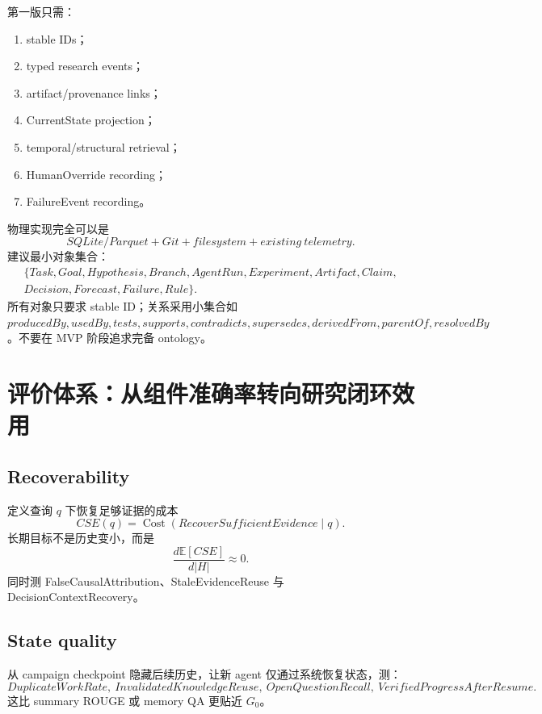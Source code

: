 \documentclass[11pt,a4paper]{ctexart}
\newcommand{\E}{\mathbb{E}}
\newcommand{\Cost}{\operatorname{Cost}}
\begin{document}
第一版只需：
\begin{enumerate}
\item stable IDs；
\item typed research events；
\item artifact/provenance links；
\item CurrentState projection；
\item temporal/structural retrieval；
\item HumanOverride recording；
\item FailureEvent recording。
\end{enumerate}
物理实现完全可以是
\begin{equation}
\boxed{SQLite/Parquet+Git+filesystem+existing\ telemetry.}
\end{equation}
建议最小对象集合：
\begin{equation}
\begin{gathered}
\{Task,Goal,Hypothesis,Branch,AgentRun,Experiment,Artifact,Claim,\\
Decision,Forecast,Failure,Rule\}.
\end{gathered}
\end{equation}
所有对象只要求 stable ID；关系采用小集合如 $producedBy,usedBy,tests,supports,\allowbreak contradicts,supersedes,\allowbreak derivedFrom,parentOf,resolvedBy$。不要在 MVP 阶段追求完备 ontology。

\section{评价体系：从组件准确率转向研究闭环效用}

\subsection{Recoverability}
定义查询 $q$ 下恢复足够证据的成本
\begin{equation}
CSE(q)=\Cost(RecoverSufficientEvidence\mid q).
\end{equation}
长期目标不是历史变小，而是
\begin{equation}
\frac{d\E[CSE]}{d|H|}\approx 0.
\end{equation}
同时测 FalseCausalAttribution、StaleEvidenceReuse 与 DecisionContextRecovery。

\subsection{State quality}
从 campaign checkpoint 隐藏后续历史，让新 agent 仅通过系统恢复状态，测：
\begin{equation}
DuplicateWorkRate,\ InvalidatedKnowledgeReuse,\ OpenQuestionRecall,\ VerifiedProgressAfterResume.
\end{equation}
这比 summary ROUGE 或 memory QA 更贴近 $G_0$。
\end{document}
